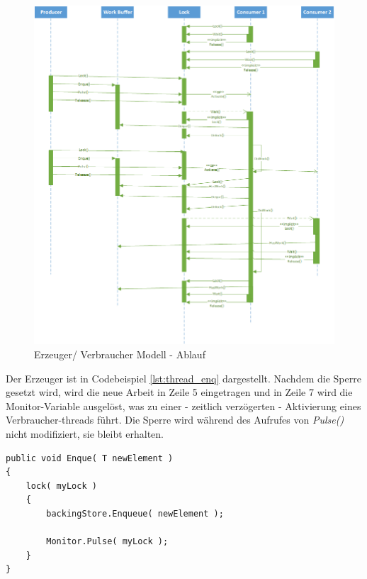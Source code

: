 \begin{figure}
	\centering
	\includegraphics[width=0.9\linewidth]{images/uml-sequence_pulse.png}
	\caption{Erzeuger/ Verbraucher Modell - Ablauf \parencite[S. 405]{posa2} }
	\label{fig:threads_pcs}
\end{figure}

Der Erzeuger ist in Codebeispiel \ref{lst:thread_enq} dargestellt. Nachdem die Sperre gesetzt wird, wird die neue Arbeit in Zeile 5 eingetragen und in Zeile 7 wird die Monitor-Variable ausgelöst, was zu einer - zeitlich verzögerten - Aktivierung eines Verbraucher-threads führt. Die Sperre wird während des Aufrufes von \textit{Pulse()} nicht modifiziert, sie bleibt erhalten.
\begin{lstlisting}[caption={Thread Monitor.Pulse()},label={lst:thread_enq},captionpos=b]
public void Enque( T newElement )
{
	lock( myLock )
	{
		backingStore.Enqueue( newElement );

		Monitor.Pulse( myLock );
	}
}
\end{lstlisting}

